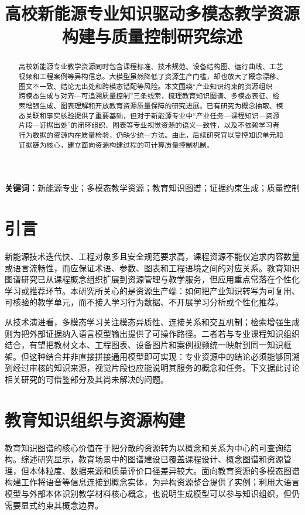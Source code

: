 \documentclass[UTF8,11pt]{ctexart}
\title{高校新能源专业知识驱动多模态教学资源构建与质量控制研究综述}
\author{}
\date{}
\begin{document}
\maketitle

\begin{abstract}
高校新能源专业教学资源同时包含课程标准、技术规范、设备结构图、运行曲线、工艺视频和工程案例等异构信息。大模型虽然降低了资源生产门槛，却也放大了概念漂移、图文不一致、结论无出处和跨模态错配等风险。本文围绕``产业知识约束的资源组织—跨模态生成与对齐—可追溯质量控制''三条线索，梳理教育知识图谱、多模态表征、检索增强生成、图表理解和开放教育资源质量保障的研究进展。已有研究为概念抽取、模态关联和事实核验提供了重要基础，但对于新能源专业中``产业任务—课程知识—资源片段—证据出处''的闭环组织、图表等专业视觉资源的语义一致性，以及不依赖学习者行为数据的资源内在质量检验，仍缺少统一方法。由此，后续研究宜以受控知识单元和证据链为核心，建立面向资源构建过程的可计算质量控制机制。
\end{abstract}

\noindent\textbf{关键词：}新能源专业；多模态教学资源；教育知识图谱；证据约束生成；质量控制

\section{引言}
新能源技术迭代快、工程对象多且安全规范要求高，课程资源不能仅追求内容数量或语言流畅性，而应保证术语、参数、图表和工程语境之间的对应关系。教育知识图谱研究已从课程概念组织扩展到资源管理与教学服务，但应用重点常落在个性化学习或推荐环节\cite{asystematicliterature2024,medukgadeep2022}。本研究所关心的是资源生产端：如何把产业知识转写为可复用、可核验的教学单元，而不接入学习行为数据、不开展学习分析或个性化推荐。

从技术演进看，多模态学习关注模态异质性、连接关系和交互机制\cite{foundationsamptrends2024}；检索增强生成则为把外部证据纳入语言模型输出提供了可操作路径\cite{retrievalaugmentedgeneration2023,asurveyon2024,retrievingmultimodalinformation2023}。二者若与专业课程知识组织结合，有望把教材文本、工程图表、设备图片和案例视频统一映射到同一知识框架。但这种结合并非直接拼接通用模型即可实现：专业资源中的结论必须能够回溯到经过审核的知识来源，视觉片段也应能说明其服务的概念和任务。下文据此讨论相关研究的可借鉴部分及其尚未解决的问题。

\section{教育知识组织与资源构建}
教育知识图谱的核心价值在于把分散的资源转为以概念和关系为中心的可查询结构。综述研究显示，教育场景中的图谱建设已覆盖课程设计、概念图谱和资源管理，但本体粒度、数据来源和质量评价口径差异较大\cite{asystematicliterature2024,medukgadeep2022}。面向教育资源的多模态图谱构建工作将语音等信息连接到概念实体，为异构资源整合提供了实例\cite{medukgadeep2022}；利用大语言模型与外部本体识别教学材料核心概念，也说明生成模型可以参与知识组织，但仍需要显式约束其概念边界\cite{coreconceptidentification2024}。
\end{document}
